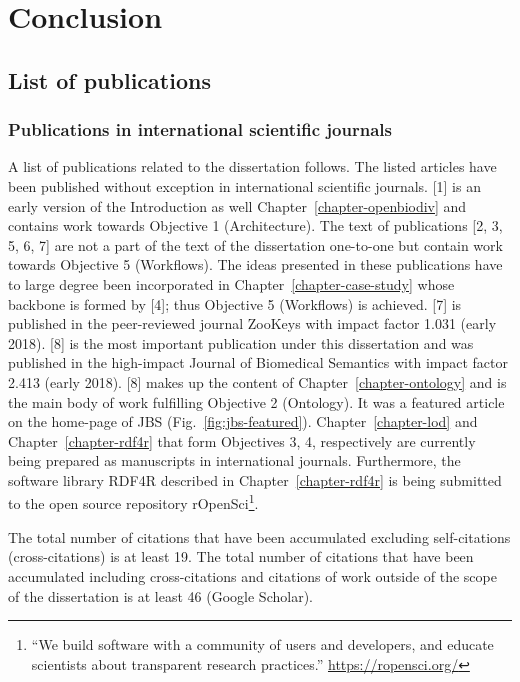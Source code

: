 \chapter*{Conclusion}
\label{chapter:summary}

\section*{List of publications}

\subsection*{Publications in international scientific journals}

A list of publications related to the dissertation follows. The listed articles have been published without exception in international scientific journals. [1] is an early version of the Introduction as well Chapter~\ref{chapter-openbiodiv} and contains work towards Objective 1 (Architecture). The text of publications [2, 3, 5, 6, 7] are not a part of the text of the dissertation one-to-one but contain work towards Objective 5 (Workflows). The ideas presented in these publications have to large degree been incorporated in Chapter~\ref{chapter-case-study} whose backbone is formed by [4]; thus Objective 5 (Workflows) is achieved. [7] is published in the peer-reviewed journal ZooKeys with impact factor 1.031 (early 2018). [8] is the most important publication under this dissertation and was published in the high-impact Journal of Biomedical Semantics with impact factor 2.413 (early 2018). [8] makes up the content of Chapter~\ref{chapter-ontology} and is the main body of work fulfilling Objective 2 (Ontology). It was a featured article on the home-page of JBS (Fig.~\ref{fig:jbs-featured}). Chapter~\ref{chapter-lod} and Chapter~\ref{chapter-rdf4r} that form Objectives 3, 4, respectively are currently being prepared as manuscripts in international journals. Furthermore, the software library RDF4R described in Chapter~\ref{chapter-rdf4r} is being submitted to the open source repository rOpenSci\footnote{``We build software with a community of users and developers, and educate scientists about transparent research practices.'' \url{https://ropensci.org/}}.

The total number of citations that have been accumulated excluding self-citations (cross-citations) is at least 19. The total number of citations that have been accumulated including cross-citations and citations of work outside of the scope of the dissertation is at least 46 (Google Scholar).

